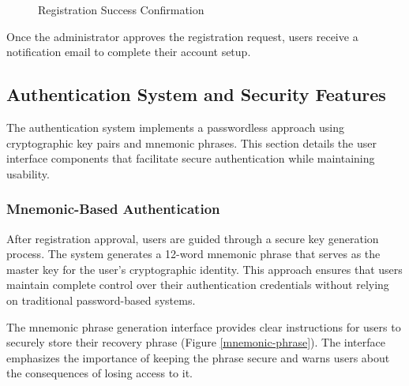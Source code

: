 \begin{figure}[H]
    \centering
    \caption{Registration Success Confirmation}
    \label{registration-success}
\end{figure}

Once the administrator approves the registration request, users receive a notification email to complete their account setup.

\subsection{Authentication System and Security Features}
The authentication system implements a passwordless approach using cryptographic key pairs and mnemonic phrases. This section details the user interface components that facilitate secure authentication while maintaining usability.

\subsubsection{Mnemonic-Based Authentication}
After registration approval, users are guided through a secure key generation process. The system generates a 12-word mnemonic phrase that serves as the master key for the user's cryptographic identity. This approach ensures that users maintain complete control over their authentication credentials without relying on traditional password-based systems.

The mnemonic phrase generation interface provides clear instructions for users to securely store their recovery phrase (Figure \ref{mnemonic-phrase}). The interface emphasizes the importance of keeping the phrase secure and warns users about the consequences of losing access to it.

